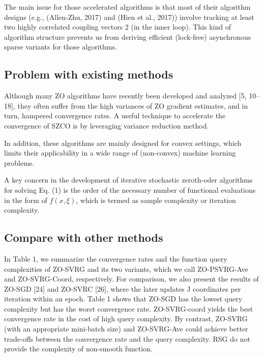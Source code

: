 \documentclass{article}
\theoremstyle{definition}
\theoremstyle{remark}
\begin{document}
{\color{DarkOrchid}
The main issue for those accelerated algorithms is that most of their algorithm designs (e.g., (Allen-Zhu, 2017)
and (Hien et al., 2017)) involve tracking at least two highly
correlated coupling vectors 2 (in the inner loop). This kind
of algorithm structure prevents us from deriving efficient
(lock-free) asynchronous sparse variants for those algorithms.
}
\subsection{Problem with existing methods}
{\color{Brown}
Although many ZO algorithms have recently been developed and analyzed [5, 10–18], they often
suffer from the high variances of ZO gradient estimates, and in turn, hampered convergence rates.
{\color{RubineRed}
A useful technique to accelerate the convergence of SZCO is by leveraging variance reduction method.
}

 In addition, these algorithms are mainly designed for convex settings, which limits their applicability in a wide range of (non-convex) machine learning problems.
}

{\color{RubineRed}
A key concern in the development of iterative stochastic zeroth-oder algorithms for solving Eq. (1) is the order of the necessary number of functional evaluations in the form of
$f(x,\xi)$, which is termed as sample complexity or iteration complexity.
}


\subsection{Compare with other methods}
{\color{Brown}
In Table 1, we summarize the convergence rates
and the function query complexities of ZO-SVRG and its two variants, which we call ZO-PSVRG-Ave
and ZO-SVRG-Coord, respectively. For comparison, we also present the results of ZO-SGD [24] and
ZO-SVRC [26], where the later updates J coordinates per iteration within an epoch. Table 1 shows
that ZO-SGD has the lowest query complexity but has the worst convergence rate. ZO-SVRG-coord
yields the best convergence rate in the cost of high query complexity. By contrast, ZO-SVRG (with
an appropriate mini-batch size) and ZO-SVRG-Ave could achieve better trade-offs between the
convergence rate and the query complexity.
}
{\color{Brown}
RSG \cite{} do not provide the complexity of non-smooth function.
}
\end{document}
